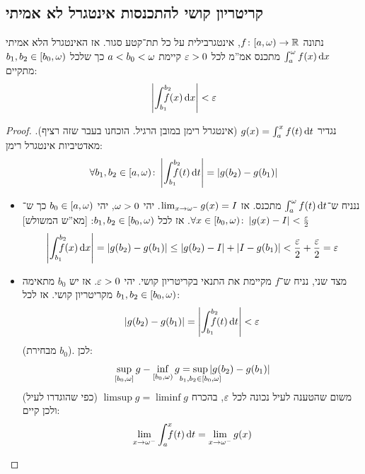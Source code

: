 \documentclass[]{../../../../tex/classes/styledArticle}
\newcommand\Is{\dequad \ }
\newcommand\hopen {[a, \wg)}
\begin{document}
	\subsection{קריטריון קושי להתכנסות אינטגרל לא אמיתי}
	\begin{Theorem}
		נתונה $f \co \hopen \to \R$, אינטגרבילית על כל תת־קטע סגור. אז האינטגרל הלא אמיתי $\int^{\omega}_a f(x)\,\mathrm{d}x$ מתכנס אמ''מ לכל $\eg > 0$ קיימת $a < b_0 < \omega$ כך שלכל $b_1, b_2 \in [b_0, \omega)$ מתקיים: 
		\[ \sof{\int^{b_2}_{b_1} \dequad f(x)\dx} < \eg \]
		
	\end{Theorem}
	\begin{proof}
		נגדיר $g(x) = \int^{x}_a f(t)\,\mathrm{d}t$ (אינטגרל רימן במובן הרגיל. הוכחנו בעבר שזה רציף). מאדטיביות אינטגרל רימן: 
		\[ \forall b_1, b_2 \in \hopen \co \sof{\int^{b_2}_{b_1}\dequad f(t)\dt} = \sof{g(b_2) - g(b_1)} \]
		\begin{itemize}
			\item[$\implies$]ננניח ש־$\int^{\omega}_a f(t)\,\mathrm{d}t$ מתכנס. אז $\lim_{x \to \omega^{-}} g(x) = I$. יהי $\omega > 0$, יהי $b_0 \in \hopen$ כך ש־$\forall x \in [b_0, \wg) \co \sof{g(x) - I} < \frac{\eg}{2}$. אז לכל $b_1, b_2 \in [b_0, \omega)$: [מא''ש המשולש]
			\[ \sof{\int^{b_2}_{b_1} \dequad f(x)\dx} = \sof{g(b_2) - g(b_1)} \le \sof{g(b_2) - I} + \sof{I - g(b_1)} < \frac{\eg}{2} + \frac{\eg}{2} = \eg \]
			\item[$\impliedby$]מצד שני, נניח ש־$f$ מקיימת את התנאי בקריטריון קושי. יהי $\eg > 0$. אז יש $b_0$ מתאימה מקריטריון קושי. אז לכל $b_1, b_2 \in [b_0, \omega)$: 
			\[ \sof{g(b_2) - g(b_1)} = \sof{\int^{b_2}_{b_1}\dequad f(t)\dt} < \eg \]
			(מבחירת $b_0$). לכן: 
			\[ \sup_{[b_0, \wg]} g - \inf_{[b_0, \wg)} g = \sup_{\mathclap{b_1, b_2 \in [b_0, \wg]}} \sof{g(b_2) - g(b_1)} \]
			משום שהטענה לעיל נכונה לכל $\eg$, בהכרח $\limsup g = \liminf g$ (כפי שהוגדרו לעיל) ולכן קיים: 
			\[ \lim_{x \to \wg^{-}}\int^{x}_a \Is f(t)\dt = \lim_{x \to \wg^{-}} g(x) \]
		\end{itemize}
	\end{proof}
	
	
\end{document}
